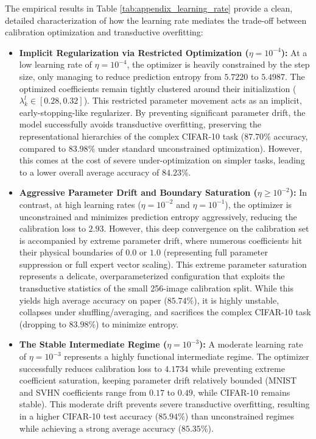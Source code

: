\documentclass{article}
\theoremstyle{plain}
\theoremstyle{definition}
\theoremstyle{remark}
\begin{document}
The empirical results in Table \ref{tab:appendix_learning_rate} provide a clean, detailed characterization of how the learning rate mediates the trade-off between calibration optimization and transductive overfitting:
\begin{itemize}
    \item \textbf{Implicit Regularization via Restricted Optimization ($\eta = 10^{-4}$):} At a low learning rate of $\eta = 10^{-4}$, the optimizer is heavily constrained by the step size, only managing to reduce prediction entropy from $5.7220$ to $5.4987$. The optimized coefficients remain tightly clustered around their initialization ($\lambda^l_k \in [0.28, 0.32]$). This restricted parameter movement acts as an implicit, early-stopping-like regularizer. By preventing significant parameter drift, the model successfully avoids transductive overfitting, preserving the representational hierarchies of the complex CIFAR-10 task ($87.70\%$ accuracy, compared to $83.98\%$ under standard unconstrained optimization). However, this comes at the cost of severe under-optimization on simpler tasks, leading to a lower overall average accuracy of $84.23\%$.
    \item \textbf{Aggressive Parameter Drift and Boundary Saturation ($\eta \ge 10^{-2}$):} In contrast, at high learning rates ($\eta = 10^{-2}$ and $\eta = 10^{-1}$), the optimizer is unconstrained and minimizes prediction entropy aggressively, reducing the calibration loss to $2.93$. However, this deep convergence on the calibration set is accompanied by extreme parameter drift, where numerous coefficients hit their physical boundaries of $0.0$ or $1.0$ (representing full parameter suppression or full expert vector scaling). This extreme parameter saturation represents a delicate, overparameterized configuration that exploits the transductive statistics of the small 256-image calibration split. While this yields high average accuracy on paper ($85.74\%$), it is highly unstable, collapses under shuffling/averaging, and sacrifices the complex CIFAR-10 task (dropping to $83.98\%$) to minimize entropy.
    \item \textbf{The Stable Intermediate Regime ($\eta = 10^{-3}$):} A moderate learning rate of $\eta = 10^{-3}$ represents a highly functional intermediate regime. The optimizer successfully reduces calibration loss to $4.1734$ while preventing extreme coefficient saturation, keeping parameter drift relatively bounded (MNIST and SVHN coefficients range from $0.17$ to $0.49$, while CIFAR-10 remains stable). This moderate drift prevents severe transductive overfitting, resulting in a higher CIFAR-10 test accuracy ($85.94\%$) than unconstrained regimes while achieving a strong average accuracy ($85.35\%$).
\end{itemize}
\end{document}
